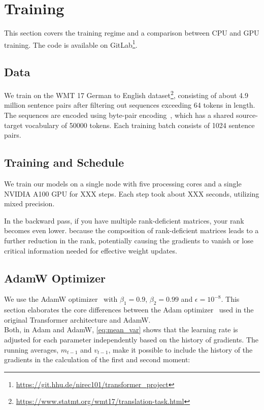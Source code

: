 \section{Training}
This section covers the training regime and a comparison between CPU and GPU training.
The code is available on GitLab\footnote{\url{https://git.hhu.de/nirec101/transformer_project}}.

\subsection{Data}
We train on the WMT 17 German to English dataset\footnote{\url{https://www.statmt.org/wmt17/translation-task.html}}, consisting of about 4.9 million sentence pairs after filtering out sequences exceeding 64 tokens in length.
The sequences are encoded using byte-pair encoding~\cite{britz2017massiveexplorationneuralmachine}, which has a shared source-target vocabulary of 50000 tokens.
Each training batch consists of 1024 sentence pairs.

\subsection{Training and Schedule}
We train our models on a single node with five processing cores and a single NVIDIA A100 GPU for XXX steps.
Each step took about XXX seconds, utilizing mixed precision.

In the backward pass, if you have multiple rank-deficient matrices, your rank becomes even lower.
because the composition of rank-deficient matrices leads to a further reduction in the rank, potentially causing the gradients to vanish or lose critical information needed for effective weight updates.

\subsection{AdamW Optimizer}
We use the AdamW optimizer~\cite{loshchilov2019decoupledweightdecayregularization} with \(\beta_1=0.9\), \(\beta_2=0.99\) and \(\epsilon=10^{-8}\).
This section elaborates the core differences between the Adam optimizer~\cite{kingma2017adammethodstochasticoptimization} used in the original Transformer architecture and AdamW.\\
Both, in Adam and AdamW, \cref{eq:mean_var} shows that the learning rate is adjusted for each parameter independently based on the history of gradients.
The running averages, \(m_{t-1}\) and \(v_{t-1}\), make it possible to include the history of the gradients in the calculation of the first and second moment:


